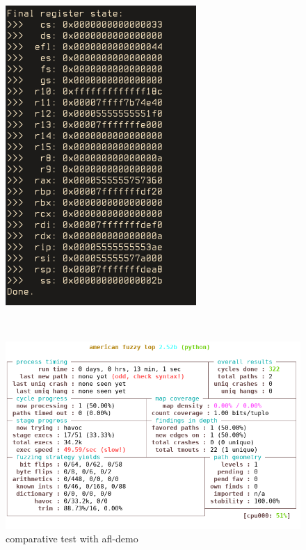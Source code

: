 \documentclass[../main.tex]{subfiles}
\begin{document}
\begin{figure}[htp]
\begin{minipage}{.5\textwidth}
\end{minipage}%
\begin{minipage}{.5\textwidth}
  \flushright
  \includegraphics[scale=0.5]{images/unicorn_afl-test.png}
\end{minipage}\\
\begin{minipage}{.5\textwidth}
  \centering
  \hspace*{-0.3in}
  \includegraphics[scale=0.48]{images/aflunicorn_no_crash.png}
\end{minipage}
\caption{comparative test with afl-demo}
\label{fig:afldemo}
\end{figure}
\end{document}
